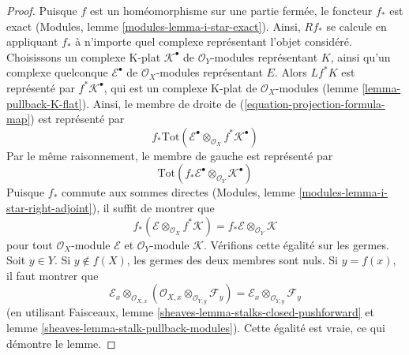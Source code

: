 \begin{proof}

Puisque $f$ est un homéomorphisme sur une partie fermée, le foncteur $f_*$
est exact (Modules, lemme \ref{modules-lemma-i-star-exact}). Ainsi,
$Rf_*$ se calcule en appliquant $f_*$ à n'importe quel complexe représentant l'objet considéré. Choisissons un complexe K-plat $\mathcal{K}^\bullet$ de $\mathcal{O}_Y$-modules représentant $K$, ainsi qu'un complexe quelconque $\mathcal{E}^\bullet$
de $\mathcal{O}_X$-modules représentant $E$. Alors
$Lf^*K$ est représenté par $f^*\mathcal{K}^\bullet$, qui est un complexe K-plat de $\mathcal{O}_X$-modules (lemme \ref{lemma-pullback-K-flat}). Ainsi, le membre de droite de (\ref{equation-projection-formula-map}) est représenté par
$$
f_*\text{Tot}(\mathcal{E}^\bullet
\otimes_{\mathcal{O}_X} f^*\mathcal{K}^\bullet)
$$
Par le même raisonnement, le membre de gauche est représenté par
$$
\text{Tot}(f_*\mathcal{E}^\bullet \otimes_{\mathcal{O}_Y} \mathcal{K}^\bullet)
$$
Puisque $f_*$ commute aux sommes directes (Modules, lemme \ref{modules-lemma-i-star-right-adjoint}), il suffit de montrer que
$$
f_*(\mathcal{E} \otimes_{\mathcal{O}_X} f^*\mathcal{K}) =
f_*\mathcal{E} \otimes_{\mathcal{O}_Y} \mathcal{K}
$$
pour tout $\mathcal{O}_X$-module $\mathcal{E}$ et $\mathcal{O}_Y$-module
$\mathcal{K}$. Vérifions cette égalité sur les germes. Soit $y \in Y$. Si $y \not \in f(X)$, les germes des deux membres sont nuls. Si $y = f(x)$, il faut montrer que
$$
\mathcal{E}_x \otimes_{\mathcal{O}_{X, x}}
(\mathcal{O}_{X, x} \otimes_{\mathcal{O}_{Y, y}} \mathcal{F}_y) =
\mathcal{E}_x \otimes_{\mathcal{O}_{Y, y}} \mathcal{F}_y
$$
(en utilisant Faisceaux, lemme \ref{sheaves-lemma-stalks-closed-pushforward}
et lemme \ref{sheaves-lemma-stalk-pullback-modules}). Cette égalité est vraie, ce qui démontre le lemme.

\end{proof}

